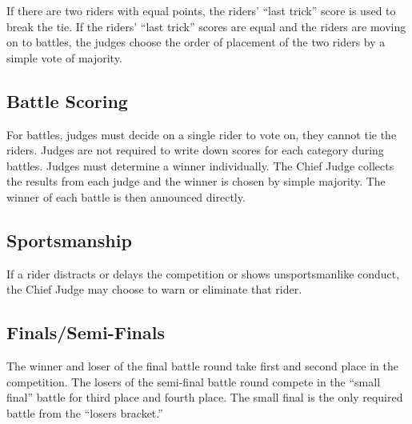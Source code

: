 If there are two riders with equal points, the riders' ``last trick'' score is used to break the tie.
If the riders' ``last trick'' scores are equal and the riders are moving on to battles, the judges choose the order of placement of the two riders by a simple vote of majority.

\subsection{Battle Scoring}
For battles, judges must decide on a single rider to vote on, they cannot tie the riders.
Judges are not required to write down scores for each category during battles.
Judges must determine a winner individually.
The Chief Judge collects the results from each judge and the winner is chosen by simple majority.
The winner of each battle is then announced directly.

\subsection{Sportsmanship}
If a rider distracts or delays the competition or shows unsportsmanlike conduct, the Chief Judge may choose to warn or eliminate that rider. 

\subsection{Finals/Semi-Finals}
The winner and loser of the final battle round take first and second place in the competition.
The losers of the semi-final battle round compete in the ``small final'' battle for third place and fourth place.
The small final is the only required battle from the ``losers bracket.''
